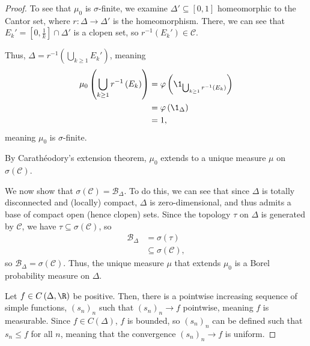 \documentclass[10pt]{mypackage}
\begin{document}
\begin{proof}
  To see that $\mu_0$ is $\sigma$-finite, we examine $\Delta'\subseteq [0,1]$ homeomorphic to the Cantor set, where $r: \Delta \rightarrow \Delta'$ is the homeomorphism. There, we can see that $E_k' = \left[ 0,\frac{1}{k} \right]\cap \Delta'$ is a clopen set, so $r^{-1}\left(E_k'\right)\in \mathcal{C}$.\newline

  Thus, $\Delta = r^{-1}\left(\bigcup_{k\geq 1}E_k'\right)$, meaning
  \begin{align*}
    \mu_0\left(\bigcup_{k\geq 1}r^{-1}\left(E_k\right)\right) &= \varphi\left(\1_{\bigcup_{k\geq 1}r^{-1}\left(E_k\right)}\right)\\
                                                            &= \varphi\left(\1_{\Delta}\right)\\
                                                            &= 1,
  \end{align*}
  meaning $\mu_0$ is $\sigma$-finite.\newline

  By Carathéodory's extension theorem, $\mu_0$ extends to a unique measure $\mu$ on $\sigma\left(\mathcal{C}\right)$.\newline

  We now show that $\sigma\left(\mathcal{C}\right) = \mathcal{B}_{\Delta}$. To do this, we can see that since $\Delta$ is totally disconnected and (locally) compact, $\Delta$ is zero-dimensional, and thus admits a base of compact open (hence clopen) sets. Since the topology $\tau$ on $\Delta$ is generated by $\mathcal{C}$, we have $\tau\subseteq \sigma\left(\mathcal{C}\right)$, so
  \begin{align*}
    \mathcal{B}_{\Delta} &= \sigma\left(\tau\right)\\
                         &\subseteq \sigma\left(\mathcal{C}\right),
  \end{align*}
  so $\mathcal{B}_{\Delta} = \sigma\left(\mathcal{C}\right)$. Thus, the unique measure $\mu$ that extends $\mu_0$ is a Borel probability measure on $\Delta$.\newline

  Let $f\in C\left(\Delta,\R\right)$ be positive. Then, there is a pointwise increasing sequence of simple functions, $\left(s_n\right)_n$ such that $\left(s_n\right)_n\rightarrow f$ pointwise, meaning $f$ is measurable. Since $f\in C\left(\Delta\right)$, $f$ is bounded, so $\left(s_n\right)_n$ can be defined such that $s_n \leq f$ for all $n$, meaning that the convergence $\left(s_n\right)_n\rightarrow f$ is uniform.\newline


\end{proof}
\end{document}
